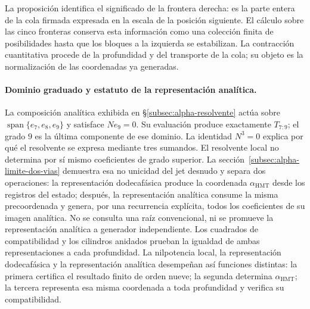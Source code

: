La proposición identifica el significado de la frontera derecha: es la
parte entera de la cola firmada expresada en la escala de la posición
siguiente. El cálculo sobre las cinco fronteras conserva esta información
como una colección finita de posibilidades hasta que los bloques a la
izquierda se estabilizan. La contracción cuantitativa procede de la
profundidad y del transporte de la cola; su objeto es la normalización de
las coordenadas ya generadas.

\paragraph{Dominio graduado y estatuto de la representación analítica.}
\label{ampl-alfa-dominio-resolvente}
La composición analítica exhibida en
\S\ref{subsec:alpha-resolvente} actúa sobre
$\operatorname{span}\{e_7,e_8,e_9\}$ y satisface $Ne_9=0$. Su
evaluación produce exactamente $T_{7:9}$; el grado $9$ es la última
componente de ese dominio. La identidad $N^3=0$ explica por qué el
resolvente se expresa mediante tres sumandos. El resolvente local no determina
por sí mismo coeficientes de grado superior. La
sección~\ref{subsec:alpha-limite-dos-vias} demuestra esa no unicidad del jet
desnudo y separa dos operaciones: la representación dodecafásica produce la
coordenada \(\alpha_{\mathrm{HMT}}\) desde los registros del estado; después,
la representación analítica consume la misma precoordenada y genera, por una
recurrencia explícita, todos los coeficientes de su imagen analítica. No se
consulta una raíz convencional, ni se promueve la representación analítica a
generador independiente. Los cuadrados de compatibilidad y los cilindros
anidados prueban la igualdad de ambas representaciones a cada profundidad. La
nilpotencia local, la representación dodecafásica y la representación analítica
desempeñan así funciones distintas: la primera certifica el resultado finito
de orden nueve; la segunda determina \(\alpha_{\mathrm{HMT}}\); la tercera
representa esa misma coordenada a toda profundidad y verifica su compatibilidad.
